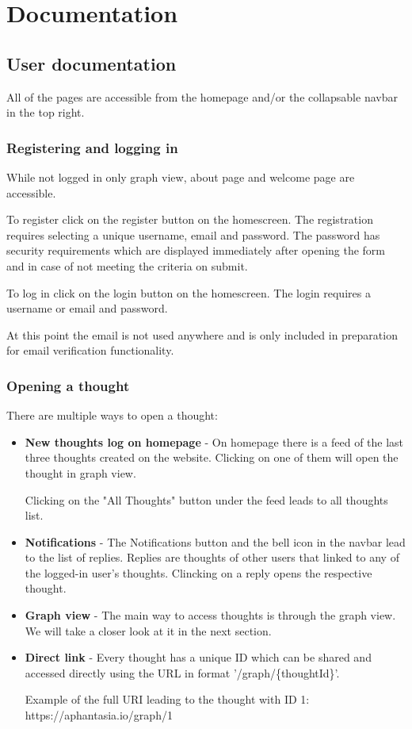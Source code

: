 \chapter{Documentation}

\section{User documentation}
All of the pages are accessible from the homepage and/or the collapsable navbar in the top right.

\subsection{Registering and logging in}
While not logged in only graph view, about page and welcome page are accessible.

To register click on the register button on the homescreen.
The registration requires selecting a unique username, email and password.
The password has security requirements which are displayed immediately
after opening the form and in case of not meeting the criteria on submit.

To log in click on the login button on the homescreen. The login requires a username or email and password.

At this point the email is not used anywhere and is only included in preparation for email verification functionality.

\subsection{Opening a thought}
There are multiple ways to open a thought:
\begin{itemize}
  \item \textbf{New thoughts log on homepage} - On homepage there is a feed of the last three thoughts created on the website.
  Clicking on one of them will open the thought in graph view.
  
  Clicking on the "All Thoughts" button under the feed leads to all thoughts list.
  \item \textbf{Notifications} - The Notifications button and the bell icon in the navbar lead to the list of replies.
  Replies are thoughts of other users that linked to any of the logged-in user's thoughts.
  Clincking on a reply opens the respective thought.
  \item \textbf{Graph view} - The main way to access thoughts is through the graph view. We will take a closer look at it in the next section.
  \item \textbf{Direct link} - Every thought has a unique ID which can be shared and accessed directly using the URL in format '/graph/\{thoughtId\}'.

  Example of the full URI leading to the thought with ID 1: https://aphantasia.io/graph/1
\end{itemize}

